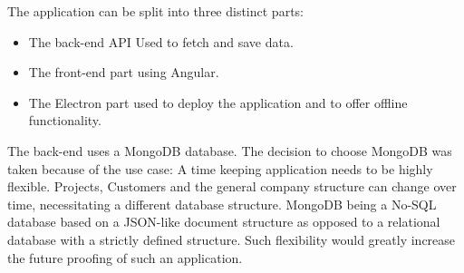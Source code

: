 
The application can be split into three distinct parts:
\begin{itemize}
    \item The back-end API Used to fetch and save data.
    \item The front-end part using Angular\parencite{angularDocs}.
    \item The Electron part used to deploy the application and to offer offline functionality.
  \end{itemize}
The back-end uses a MongoDB database. The decision to choose MongoDB was taken because of the use
case: A time keeping application needs to be highly flexible.
Projects, Customers and the general company structure can change over time, necessitating 
a different database structure. 
MongoDB being a No-SQL database based on a JSON-like document structure as opposed 
to a relational database with a strictly defined structure. 
Such flexibility would greatly increase the future proofing of such an application.\paragraph{}
